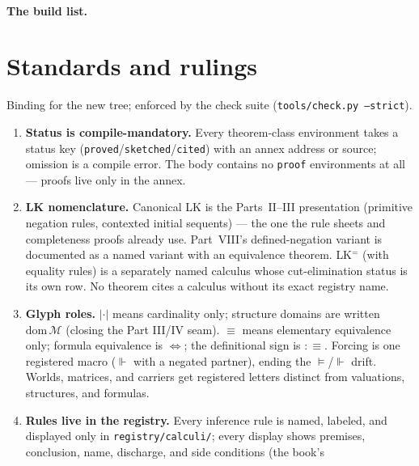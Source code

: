\documentclass[11pt,letterpaper]{article}
\begin{document}
\paragraph{The build list.}


\section{Standards and rulings}
\label{sec:rulings}

Binding for the new tree; enforced by the check suite
(\texttt{tools/check.py --strict}).

\begin{enumerate}[label=\textbf{Ruling \arabic*.},ref=\arabic*,leftmargin=2.2em]
  \item \label{ruling:status}\textbf{Status is compile-mandatory.}
        Every theorem-class environment takes a status key
        (\texttt{proved}/\texttt{sketched}/\texttt{cited}) with an annex
        address or source; omission is a compile error.  The body
        contains no \texttt{proof} environments at all --- proofs live
        only in the annex.
  \item \textbf{LK nomenclature.}  Canonical \textsf{LK} is the
        Parts~II--III presentation (primitive negation rules, contexted
        initial sequents) --- the one the rule sheets and completeness
        proofs already use.  Part~VIII's defined-negation variant is
        documented as a named variant with an equivalence theorem.
        \textsf{LK}$^=$ (with equality rules) is a separately named
        calculus whose cut-elimination status is its own row.  No
        theorem cites a calculus without its exact registry name.
  \item \textbf{Glyph roles.}  $|\cdot|$ means cardinality only;
        structure domains are written $\mathrm{dom}\,\mathcal M$
        (closing the Part III/IV seam).  $\equiv$ means elementary
        equivalence only; formula equivalence is $\Leftrightarrow$; the
        definitional sign is $:\equiv$.  Forcing is one registered
        macro ($\Vdash$ with a negated partner), ending the
        $\models$/$\Vdash$ drift.  Worlds, matrices, and carriers get
        registered letters distinct from valuations, structures, and
        formulas.
  \item \textbf{Rules live in the registry.}  Every inference rule is
        named, labeled, and displayed only in
        \texttt{registry/calculi/}; every display shows premises,
        conclusion, name, discharge, and side conditions (the book's

\end{enumerate}
\end{document}
